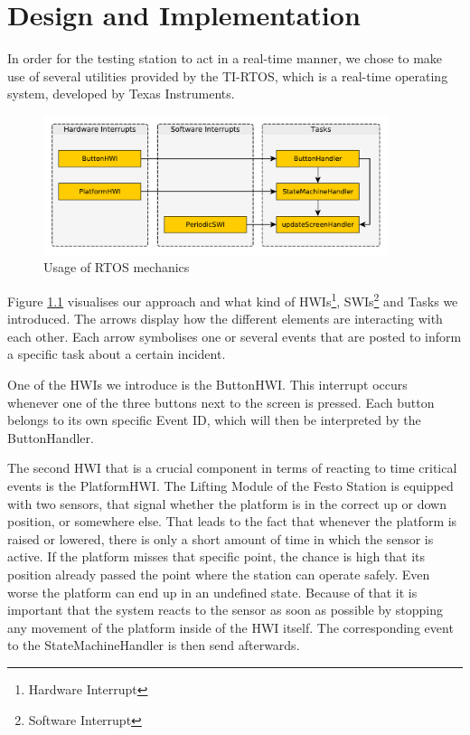\chapter{Design and Implementation} %

In order for the testing station to act in a real-time manner, we chose to make use of several utilities provided by the TI-RTOS, which is a real-time operating system, developed by Texas Instruments.

\begin{figure}[H]
	\begin{center}
		\includegraphics[width=0.9\textwidth]{media/RTOS.pdf} 	
		\caption{Usage of RTOS mechanics}
		\label{fig:rtos}
	\end{center}
\end{figure}

Figure \ref{fig:rtos} visualises our approach and what kind of HWIs\footnote{Hardware Interrupt}, SWIs\footnote{Software Interrupt} and Tasks we introduced.
The arrows display how the different elements are interacting with each other.
Each arrow symbolises one or several events that are posted to inform a specific task about a certain incident.

One of the HWIs we introduce is the ButtonHWI.
This interrupt occurs whenever one of the three buttons next to the screen is pressed.
Each button belongs to its own specific Event ID, which will then be interpreted by the ButtonHandler.

The second HWI that is a crucial component in terms of reacting to time critical events is the PlatformHWI.
The Lifting Module of the Festo Station is equipped with two sensors, that signal whether the platform is in the correct up or down position, or somewhere else.
That leads to the fact that whenever the platform is raised or lowered, there is only a short amount of time in which the sensor is active.
If the platform misses that specific point, the chance is high that its position already passed the point where the station can operate safely.
Even worse the platform can end up in an undefined state.
Because of that it is important that the system reacts to the sensor as soon as possible by stopping any movement of the platform inside of the HWI itself.
The corresponding event to the StateMachineHandler is then send afterwards.

